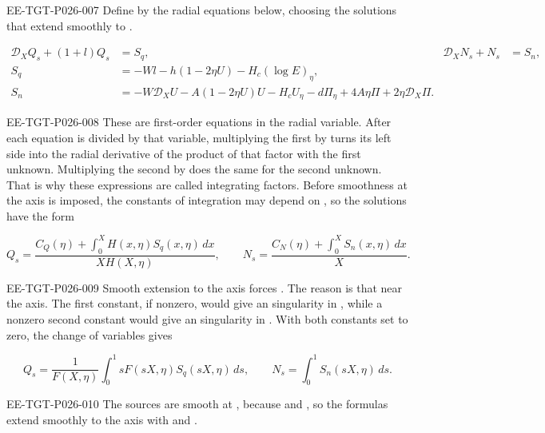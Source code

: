 \begin{EESegment}{EE-TGT-P026-007}
Define  by the radial equations below, choosing
the solutions that extend smoothly to .
\end{EESegment}
\begin{equation}
\begin{aligned}
 \mathcal D_XQ_s+(1+l)Q_s&=S_q,& \mathcal D_XN_s+N_s&=S_n,\\
 S_q&=-Wl-h(1-2\eta U)-H_c(\log E)_\eta,\\
 S_n&=-W\mathcal D_XU-A(1-2\eta U)U-H_cU_\eta
      -d\Pi_\eta+4A\eta\Pi+2\eta \mathcal D_X\Pi.
\end{aligned}
\tag{4.9}\label{eq:4.9}
\end{equation}
\begin{EESegment}{EE-TGT-P026-008}
These are first-order equations in the radial variable. After each equation is divided by that
variable, multiplying the first by  turns its left side into the radial
derivative of the product of that factor with the first unknown. Multiplying the second by
 does the same for the second unknown. That is why these expressions are
called integrating factors. Before smoothness at the
axis is imposed, the constants of integration may depend on
, so the solutions have the form
\end{EESegment}
\begin{equation}
 Q_s=\frac{C_Q(\eta)+\int_0^X H(x,\eta)S_q(x,\eta)\,dx}{XH(X,\eta)},
 \qquad
 N_s=\frac{C_N(\eta)+\int_0^X S_n(x,\eta)\,dx}{X}.
\tag{4.10}\label{eq:4.10}
\end{equation}
\begin{EESegment}{EE-TGT-P026-009}
Smooth extension to the axis forces
. The reason is that
 near the axis. The first constant,
if nonzero, would give an  singularity in
, while a nonzero second constant would give an
 singularity in .
With both constants set to zero, the change of
variables  gives
\end{EESegment}
\[
 Q_s=\frac{1}{F(X,\eta)}\int_0^1 sF(sX,\eta)S_q(sX,\eta)\,ds,
 \qquad
 N_s=\int_0^1 S_n(sX,\eta)\,ds.
\]
\begin{EESegment}{EE-TGT-P026-010}
The sources are smooth at , because
 and
, so the formulas extend
smoothly to the axis with
 and
.
\end{EESegment}

